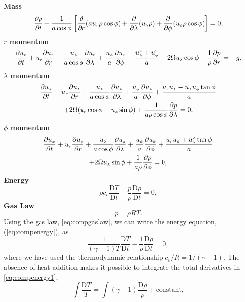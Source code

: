 {\bfseries Mass}
\begin{equation}
\drhod{t}+\frac{1}{a\cos\phi}\left[ \frac{\partial}{\partial r}(a\ur\rho\cos\phi) + \frac{\partial}{\partial \lambda}(\ulam\rho) + \frac{\partial}{\partial \phi}(\uphi\rho\cos\phi)  \right]=0, \label{eq:compmass}
\end{equation}
{\bfseries \boldmath$r$ momentum}
\begin{equation}
\durd{t} +\ur\durd{r}+ \frac{\ulam}{a\cos\phi}\durd{\lambda}+\frac{\uphi}{a}\durd{\phi}-\frac{\ulams+\uphis}{a}-2\Omega\ulam\cos\phi+\frac{1}{\rho}\dpd{r}= -g,\label{eq:compr}
\end{equation}
{\bfseries \boldmath$\lambda$ momentum}
\begin{multline}
\dulamd{t} +\ur\dulamd{r}+ \frac{\ulam}{a\cos\phi}\dulamd{\lambda}+\frac{\uphi}{a}\dulamd{\phi}+\frac{\ur\ulam-\ulam\uphi\tan\phi}{a}\\+2\Omega(\ur\cos\phi-\uphi\sin\phi)+\frac{1}{a\rho\cos\phi}\dpd{\lambda}= 0, \label{eq:complam}
\end{multline}
{\bfseries \boldmath$\phi$ momentum}
\begin{multline}
\duphid{t} +\ur\duphid{r}+ \frac{\ulam}{a\cos\phi}\duphid{\lambda}+\frac{\uphi}{a}\duphid{\phi}+\frac{\ur\uphi+\ulams\tan\phi}{a}\\+2\Omega\ulam\sin\phi+\frac{1}{a\rho}\dpd{\phi}= 0, \label{eq:compphi}
\end{multline}
{\bfseries Energy}
\begin{equation}
\rho c_v \frac{\mbox{D} T}{\mbox{D} t} - \frac{p}{\rho}\frac{\mbox{D} \rho}{\mbox{D} t}=0,
\label{eq:compenergy}
\end{equation}
{\bfseries Gas Law}
\begin{equation}
p=\rho R T.
\label{eq:compgaslaw}
\end{equation}
Using the gas law, \eqref{eq:compgaslaw}, we can write the energy equation, (\ref{eq:compenergy}), as
\begin{equation}
\frac{1}{(\gamma-1)T}\frac{\mbox{D} T}{\mbox{D} t}-\frac{1}{\rho}\frac{\mbox{D} \rho}{\mbox{D} t}=0,
\label{eq:compenergy1}
\end{equation}
where we have used the thermodynamic relationship $c_v/R=1/(\gamma-1)$. The absence of heat addition makes it possible to integrate the total derivatives in \eqref{eq:compenergy1},
\begin{equation*}
\int \frac{\mbox{D}T}{T}=\int (\gamma-1) \frac{\mbox{D}\rho}{\rho} + \mbox{constant},
\end{equation*}
